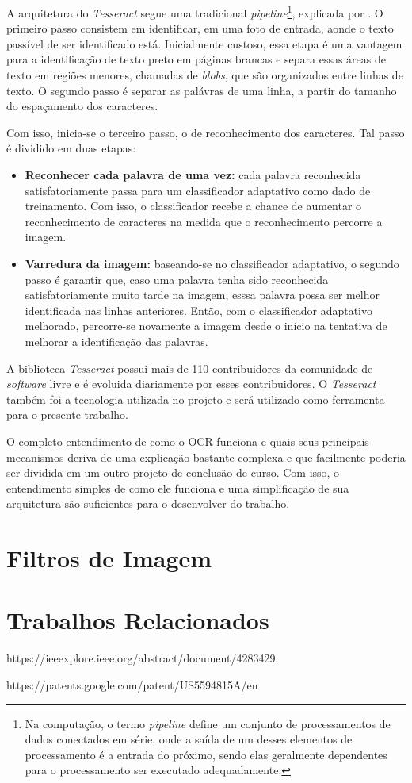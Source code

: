 A arquitetura do \textit{Tesseract} segue uma tradicional \textit{pipeline}\footnote{
  Na computação, o termo \textit{pipeline} define um conjunto de processamentos de dados conectados em série, onde a saída de um desses elementos de processamento é a entrada do próximo, sendo elas geralmente dependentes para o processamento ser executado adequadamente.
}, explicada por . O primeiro passo consistem em identificar, em uma foto de entrada, aonde o texto passível de ser identificado está. Inicialmente custoso, essa etapa é uma vantagem para a identificação de texto preto em páginas brancas e separa essas áreas de texto em regiões menores, chamadas de \textit{blobs}, que são organizados entre linhas de texto. O segundo passo é separar as palávras de uma linha, a partir do tamanho do espaçamento dos caracteres.

Com isso, inicia-se o terceiro passo, o de reconhecimento dos caracteres. Tal passo é dividido em duas etapas:

\begin{itemize}
  \item \textbf{Reconhecer cada palavra de uma vez:} cada palavra reconhecida satisfatoriamente passa para um classificador adaptativo como dado de treinamento. Com isso, o classificador recebe a chance de aumentar o reconhecimento de caracteres na medida que o reconhecimento percorre a imagem.
  \item \textbf{Varredura da imagem:} baseando-se no classificador adaptativo, o segundo passo é garantir que, caso uma palavra tenha sido reconhecida satisfatoriamente muito tarde na imagem, esssa palavra possa ser melhor identificada nas linhas anteriores. Então, com o classificador adaptativo melhorado, percorre-se novamente a imagem desde o início na tentativa de melhorar a identificação das palavras. 
\end{itemize}

A biblioteca \textit{Tesseract} possui mais de 110 contribuidores da comunidade de \textit{software} livre e é evoluida diariamente por esses contribuidores. O \textit{Tesseract} também foi a tecnologia utilizada no projeto  e será utilizado como ferramenta para o presente trabalho.

\ornament

O completo entendimento de como o OCR funciona e quais seus principais mecanismos deriva de uma explicação bastante complexa e que facilmente poderia ser dividida em um outro projeto de conclusão de curso. Com isso, o entendimento simples de como ele funciona e uma simplificação de sua arquitetura são suficientes para o desenvolver do trabalho.


\section{Filtros de Imagem}


\section{Trabalhos Relacionados}

https://ieeexplore.ieee.org/abstract/document/4283429

https://patents.google.com/patent/US5594815A/en

